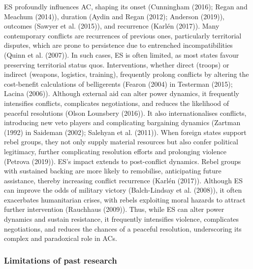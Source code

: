 \documentclass[
]{article}
\begin{document}
ES profoundly influences AC, shaping its onset (Cunningham (2016); Regan
and Meachum (2014)), duration (Aydin and Regan (2012); Anderson (2019)),
outcomes (Sawyer et al. (2015)), and recurrence (Karlén (2017)). Many
contemporary conflicts are recurrences of previous ones, particularly
territorial disputes, which are prone to persistence due to entrenched
incompatibilities (Quinn et al. (2007)). In such cases, ES is often
limited, as most states favour preserving territorial status quos.
Interventions, whether direct (troops) or indirect (weapons, logistics,
training), frequently prolong conflicts by altering the cost-benefit
calculations of belligerents (Fearon (2004) in Testerman (2015); Lacina
(2006)). Although external aid can alter power dynamics, it frequently
intensifies conflicts, complicates negotiations, and reduces the
likelihood of peaceful resolutions (Olson Lounsbery (2016)). It also
internationalises conflicts, introducing new veto players and
complicating bargaining dynamics (Zartman (1992) in Saideman (2002);
Salehyan et al. (2011)). When foreign states support rebel groups, they
not only supply material resources but also confer political legitimacy,
further complicating resolution efforts and prolonging violence (Petrova
(2019)). ES's impact extends to post-conflict dynamics. Rebel groups
with sustained backing are more likely to remobilise, anticipating
future assistance, thereby increasing conflict recurrence (Karlén
(2017)). Although ES can improve the odds of military victory
(Balch-Lindsay et al. (2008)), it often exacerbates humanitarian crises,
with rebels exploiting moral hazards to attract further intervention
(Rauchhaus (2009)). Thus, while ES can alter power dynamics and sustain
resistance, it frequently intensifies violence, complicates
negotiations, and reduces the chances of a peaceful resolution,
underscoring its complex and paradoxical role in ACs.

\subsubsection{Limitations of past
research}\label{limitations-of-past-research}
\end{document}
